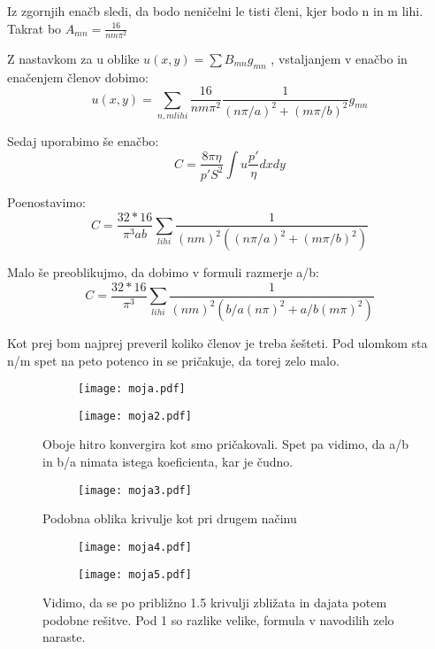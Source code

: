 \documentclass{article}
\begin{document}
Iz zgornjih enačb sledi, da bodo neničelni le tisti členi, kjer bodo n in m lihi.
Takrat bo $A_{mn} = \frac{16}{nm \pi^2}$

Z nastavkom za u oblike $u(x,y) = \sum B_{mn} g_{mn}$ , vstaljanjem v enačbo
in enačenjem členov dobimo:
\begin{equation*}
u(x,y) = \sum_{n,m lihi} \frac{16}{nm \pi ^2}\frac{1}{(n \pi /a)^2 + (m \pi /b)^2} g_{mn}
\end{equation*}

Sedaj uporabimo še enačbo:
\begin{equation*}
C = \frac{8 \pi \eta}{p' S^2} \int u \frac{p'}{\eta} dx dy
\end{equation*}

Poenostavimo:
\begin{equation*}
C = \frac{32*16}{\pi^3 ab} \sum_{lihi} \frac{1}{(nm)^2 ( (n\pi /a)^2 + (m \pi /b)^2)}
\end{equation*}

Malo še preoblikujmo, da dobimo v formuli razmerje a/b:
\begin{equation*}
C = \frac{32*16}{\pi^3} \sum_{lihi} \frac{1}{(nm)^2 ( b/a(n\pi )^2 + a/b(m \pi )^2)}
\end{equation*}


Kot prej bom najprej preveril koliko členov je treba šešteti. Pod ulomkom sta n/m spet na peto potenco in se pričakuje, da torej zelo malo.

\begin{figure}[H]
\begin{subfigure}{.5\textwidth}
\texttt{[image: moja.pdf]}
\end{subfigure}
\begin{subfigure}{.5\textwidth}
\texttt{[image: moja2.pdf]}
\end{subfigure}
\caption*{Oboje hitro konvergira kot smo pričakovali. Spet pa vidimo, da a/b in b/a nimata istega koeficienta, kar je čudno.} 
\end{figure}

\begin{figure}[H]
\centering
\begin{subfigure}{.5\textwidth}
\texttt{[image: moja3.pdf]}
\end{subfigure}
\caption*{Podobna oblika krivulje kot pri drugem načinu}
\end{figure}

\begin{figure}[H]
\begin{subfigure}{.5\textwidth}
\texttt{[image: moja4.pdf]}
\end{subfigure}
\begin{subfigure}{.5\textwidth}
\texttt{[image: moja5.pdf]}
\end{subfigure}
\caption*{Vidimo, da se po približno 1.5 krivulji zbližata in dajata potem podobne rešitve. Pod 1 so razlike velike, formula v navodilih zelo naraste.} 
\end{figure}
\end{document}
